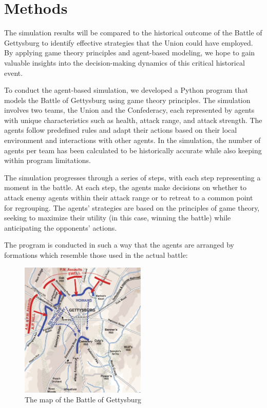 \documentclass[final,5p,times,twocolumn,authoryear]{elsarticle}
\begin{document}
\section{Methods}
The simulation results will be compared to the historical outcome of the Battle of Gettysburg to identify effective strategies that the Union could have employed. By applying game theory principles and agent-based modeling, we hope to gain valuable insights into the decision-making dynamics of this critical historical event. 

To conduct the agent-based simulation, we developed a Python program that models the Battle of Gettysburg using game theory principles. The simulation involves two teams, the Union and the Confederacy, each represented by agents with unique characteristics such as health, attack range, and attack strength. The agents follow predefined rules and adapt their actions based on their local environment and interactions with other agents. In the simulation, the number of agents per team has been calculated to be historically accurate while also keeping within program limitations.

The simulation progresses through a series of steps, with each step representing a moment in the battle. At each step, the agents make decisions on whether to attack enemy agents within their attack range or to retreat to a common point for regrouping. The agents' strategies are based on the principles of game theory, seeking to maximize their utility (in this case, winning the battle) while anticipating the opponents' actions.

The program is conducted in such a way that the agents are arranged by formations which resemble those used in the actual battle:

\begin{figure}[!ht]
  \centering
      \includegraphics[width=6cm]{Gettysburg_map.png}
      \caption{The map of the Battle of Gettysburg}
      \label{fig:Map}
  \centering
\end{figure}
\end{document}
